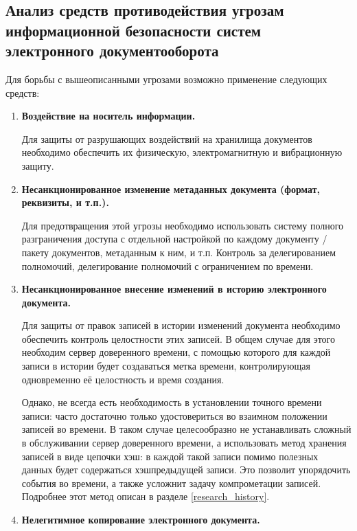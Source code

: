 \subsection{Анализ средств противодействия угрозам информационной безопасности систем электронного документооборота} \label{threats_neutralizers}

Для борьбы с вышеописанными угрозами возможно применение следующих средств:
\begin{enumerate} [label=\textbf{\arabic*}. ]
	\item \textbf{Воздействие на носитель информации.}
	\nopagebreak

	Для защиты от разрушающих воздействий на хранилища документов необходимо обеспечить их физическую, электромагнитную и вибрационную защиту.

	\item \textbf{Несанкционированное изменение метаданных документа (формат, реквизиты, и т.п.).}

	\nopagebreak
	Для предотвращения этой угрозы необходимо использовать систему полного разграничения доступа с отдельной настройкой по каждому документу / пакету документов, метаданным к ним, и т.п. Контроль за делегированием полномочий, делегирование полномочий с ограничением по времени.

	\item \textbf{Несанкционированное внесение изменений в историю электронного документа.}

	\nopagebreak
	Для защиты от правок записей в истории изменений документа необходимо обеспечить контроль целостности этих записей. В общем случае для этого необходим сервер доверенного времени, с помощью которого для каждой записи в истории будет создаваться метка времени, контролирующая одновременно её целостность и время создания.

	\vspace{\baselineskip}
	Однако, не всегда есть необходимость в установлении точного времени записи: часто достаточно только удостовериться во взаимном положении записей во времени. В таком случае целесообразно не устанавливать сложный в обслуживании сервер доверенного времени, а использовать метод хранения записей в виде цепочки хэш: в каждой такой записи помимо полезных данных будет содержаться хэш предыдущей записи. Это позволит упорядочить события во времени, а также усложнит задачу компрометации записей. Подробнее этот метод описан в разделе \ref{research_history}.

	\item \textbf{Нелегитимное копирование электронного документа.}


\end{enumerate}

